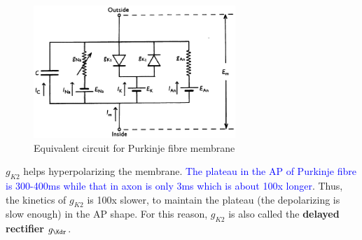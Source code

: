 \begin{figure}[hbt]
  \centerline{\includegraphics[height=5cm]{./images/circuit_Purkinjie.eps}}
  \caption{Equivalent circuit for Purkinje fibre membrane}
  \label{fig:circuit_Purkinjie}
\end{figure}



\begin{framed}
  $g_{K2}$ helps hyperpolarizing the membrane.
  \textcolor{blue}{The plateau in the AP of Purkinje fibre is
    300-400ms while that in axon is only 3ms which is about 100x
    longer}.
  Thus, the kinetics of $g_{K2}$ is 100x slower, to maintain the
  plateau (the depolarizing is slow enough) in the AP shape. For this
  reason, $g_{K2}$ is also called the {\bf delayed rectifier}
  $g_\Kdr$.
\end{framed}

